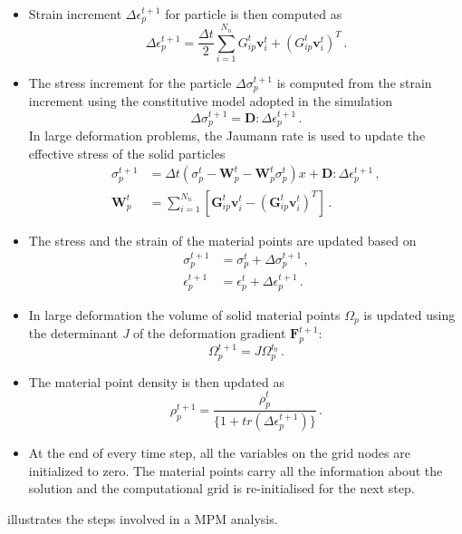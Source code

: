 \begin{itemize}
\item
Strain increment $\Delta \epsilon_{p}^{t+1}$ for particle is then computed as
%
\begin{equation}
\Delta \epsilon_{p}^{t+1} = \frac{\Delta t}{2} 
\sum\limits_{\mathit{i}=1}^{\mathit{N}_{n}}{{G}_{\mathit{ip}}^{t} 
\mathbf{v}_{\mathit{i}}^{t} + ({G}_{\mathit{ip}}^{t} 
\mathbf{v}_{\mathit{i}}^{t})^{\mathit{T}}} \,.
\end{equation}
\item
The stress increment for the particle $\Delta \sigma_{\mathit{p}}^{t+1}$ is 
computed from the strain increment using the constitutive model adopted in the 
simulation
%
\begin{equation}
\Delta \sigma_{\mathit{p}}^{t+1} = \mathbf{D} : \Delta \epsilon_{p}^{t+1} \,.
\end{equation}
%
In large deformation problems, the Jaumann rate is used to update the effective 
stress of the solid particles
\begin{align}
\sigma_p^{t+1} & = \Delta t \left( \sigma_p^t - \mathbf{W}_p^t - 
\mathbf{W}_p^t \sigma_p^t\right) x+ 
\mathbf{D} : \Delta \epsilon_{p}^{t+1} \,, \\
\mathbf{W}_p^t & = \sum\limits_{i = 1}^{N_n}\left[ \mathbf{G}_{ip}^t 
\textbf{v}_i^t -  \left(\mathbf{G}_{ip}^t \textbf{v}_i^t\right)^T\right]  \,.
\end{align}
\item
The stress and the strain of the material points are updated based on
%
\begin{align}
\nonumber
\sigma_{\mathit{p}}^{t+1} & = \sigma_{\mathit{p}}^{t} + \Delta 
\sigma_{\mathit{p}}^{t+1} \,, \\
\epsilon_{p}^{t+1} & =\epsilon_{p}^{t} + \Delta \epsilon_{p}^{t+1} \,.
\end{align}
%

\item
In large deformation the volume of solid material points $\Omega_p$ is updated 
using the determinant \textit{J} of the deformation gradient 
$\mathbf{F}_p^{t+1}$:
\begin{equation}
\Omega_p^{t+1} = J \Omega_p^{t_0} \,.
\end{equation}

\item
The material point density is then updated as
%
\begin{equation}
\rho_{p}^{t+1}=\frac{\rho_{p}^{t}}{\{1+tr(\Delta \epsilon_{p}^{t+1})\}} \,.
\end{equation}
%

\item
At the end of every time step, all the variables on the grid nodes are 
initialized to zero. The material points carry all the information about the
solution and the computational grid is re-initialised for the next step.
\end{itemize}
 illustrates the steps involved in a MPM analysis. 

